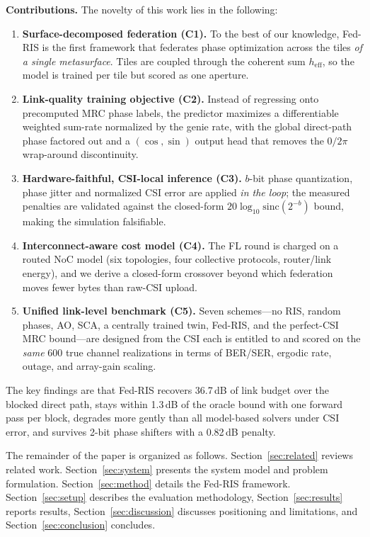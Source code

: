 \documentclass[conference]{IEEEtran}
\newcommand{\fedris}{Fed-RIS}
\newcommand{\dB}{\,dB\xspace}
\begin{document}
\textbf{Contributions.} The novelty of this work lies in the following:
\begin{enumerate}
\item \textbf{Surface-decomposed federation (C1).} To the best of our knowledge, \fedris{} is the first framework that federates phase optimization across the tiles \emph{of a single metasurface}. Tiles are coupled through the coherent sum $h_\text{eff}$, so the model is trained per tile but scored as one aperture.
\item \textbf{Link-quality training objective (C2).} Instead of regressing onto precomputed MRC phase labels, the predictor maximizes a differentiable weighted sum-rate normalized by the genie rate, with the global direct-path phase factored out and a $(\cos,\sin)$ output head that removes the $0/2\pi$ wrap-around discontinuity.
\item \textbf{Hardware-faithful, CSI-local inference (C3).} $b$-bit phase quantization, phase jitter and normalized CSI error are applied \emph{in the loop}; the measured penalties are validated against the closed-form $20\log_{10}\mathrm{sinc}(2^{-b})$ bound, making the simulation falsifiable.
\item \textbf{Interconnect-aware cost model (C4).} The FL round is charged on a routed NoC model (six topologies, four collective protocols, router/link energy), and we derive a closed-form crossover beyond which federation moves fewer bytes than raw-CSI upload.
\item \textbf{Unified link-level benchmark (C5).} Seven schemes---no RIS, random phases, AO, SCA, a centrally trained twin, \fedris{}, and the perfect-CSI MRC bound---are designed from the CSI each is entitled to and scored on the \emph{same} 600 true channel realizations in terms of BER/SER, ergodic rate, outage, and array-gain scaling.
\end{enumerate}

The key findings are that \fedris{} recovers 36.7\dB of link budget over the blocked direct path, stays within 1.3\dB of the oracle bound with one forward pass per block, degrades more gently than all model-based solvers under CSI error, and survives 2-bit phase shifters with a 0.82\dB penalty.

The remainder of the paper is organized as follows. Section~\ref{sec:related} reviews related work. Section~\ref{sec:system} presents the system model and problem formulation. Section~\ref{sec:method} details the \fedris{} framework. Section~\ref{sec:setup} describes the evaluation methodology, Section~\ref{sec:results} reports results, Section~\ref{sec:discussion} discusses positioning and limitations, and Section~\ref{sec:conclusion} concludes.
\end{document}
